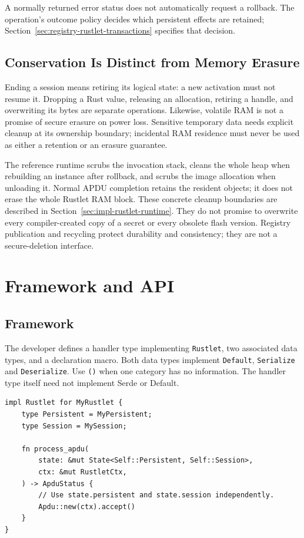 A normally returned error status does not automatically request a rollback.
The operation's outcome policy decides which persistent effects are retained;
Section~\ref{sec:registry-rustlet-transactions} specifies that decision.

\subsection{Conservation Is Distinct from Memory Erasure}
\label{subsec:rustlet-state-erasure}

Ending a session means retiring its logical state: a new activation must not
resume it. Dropping a Rust value, releasing an allocation, retiring a handle,
and overwriting its bytes are separate operations. Likewise, volatile RAM
is not a promise of secure erasure on power loss. Sensitive temporary data
needs explicit cleanup at its ownership boundary; incidental RAM residence
must never be used as either a retention or an erasure guarantee.

The reference runtime scrubs the invocation stack, cleans the whole heap
when rebuilding an instance after rollback, and scrubs the image allocation
when unloading it. Normal APDU completion retains the resident objects; it
does not erase the whole Rustlet RAM block. These concrete cleanup boundaries
are described in Section~\ref{sec:impl-rustlet-runtime}. They do not promise
to overwrite every compiler-created copy of a secret or every obsolete
flash version. Registry publication and recycling protect durability and
consistency; they are not a secure-deletion interface.


\section{Framework and API}

\subsection{Framework}

The developer defines a handler type implementing \texttt{Rustlet}, two
associated data types, and a declaration macro. Both data types implement
\texttt{Default}, \texttt{Serialize} and \texttt{Deserialize}. Use
\texttt{()} when one category has no information. The handler type itself
need not implement Serde or Default.

\begin{samepage}
\begin{verbatim}
impl Rustlet for MyRustlet {
    type Persistent = MyPersistent;
    type Session = MySession;

    fn process_apdu(
        state: &mut State<Self::Persistent, Self::Session>,
        ctx: &mut RustletCtx,
    ) -> ApduStatus {
        // Use state.persistent and state.session independently.
        Apdu::new(ctx).accept()
    }
}
\end{verbatim}
\end{samepage}

